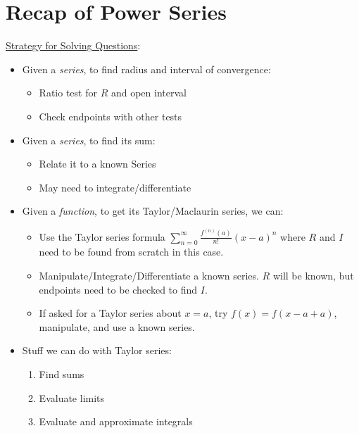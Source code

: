 \section*{Recap of Power Series}
\underline{Strategy for Solving Questions}:
\begin{itemize}
    \item Given a \emph{series}, to find radius and interval of
          convergence:
          \begin{itemize}
              \item Ratio test for $ R $ and open interval
              \item Check endpoints with other tests
          \end{itemize}
    \item Given a \emph{series}, to find its sum:
          \begin{itemize}
              \item Relate it to a known Series
              \item May need to integrate/differentiate
          \end{itemize}
    \item Given a \emph{function},
          to get its Taylor/Maclaurin series, we can:
          \begin{itemize}
              \item Use the Taylor series formula $ \displaystyle \sum\limits_{n=0}^{\infty}
                        \frac{f^{(n)}(a)}{n!} (x-a)^n $ where $ R $ and $ I $ need to be found from scratch
                    in this case.
              \item Manipulate/Integrate/Differentiate a known series. $ R $ will be known,
                    but endpoints need to be checked to find $ I $.
              \item If asked for a Taylor series about $ x=a $, try $ f(x)=f(x-a+a) $,
                    manipulate, and use a known series.
          \end{itemize}
    \item Stuff we can do with Taylor series:
          \begin{enumerate}
              \item Find sums
              \item Evaluate limits
              \item Evaluate and approximate integrals
          \end{enumerate}
\end{itemize}
